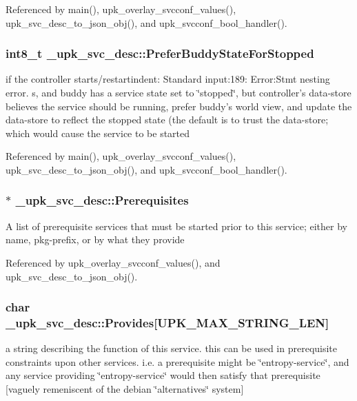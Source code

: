 Referenced by main(), upk\_\-overlay\_\-svcconf\_\-values(), upk\_\-svc\_\-desc\_\-to\_\-json\_\-obj(), and upk\_\-svcconf\_\-bool\_\-handler().

\subsubsection[{PreferBuddyStateForStopped}]{\setlength{\rightskip}{0pt plus 5cm}int8\_\-t {\bf \_\-upk\_\-svc\_\-desc::PreferBuddyStateForStopped}}\label{struct__upk__svc__desc_a7122c24ad2843e92e8375826884c117e}
if the controller starts/restartindent: Standard input:189: Error:Stmt nesting error. s, and buddy has a service state set to \char`\"{}stopped\char`\"{}, but controller's data-\/store believes the service should be running, prefer buddy's world view, and update the data-\/store to reflect the stopped state (the default is to trust the data-\/store; which would cause the service to be started 

Referenced by main(), upk\_\-overlay\_\-svcconf\_\-values(), upk\_\-svc\_\-desc\_\-to\_\-json\_\-obj(), and upk\_\-svcconf\_\-bool\_\-handler().

\subsubsection[{Prerequisites}]{$\ast$ {\bf \_\-upk\_\-svc\_\-desc::Prerequisites}}\label{struct__upk__svc__desc_ad95e655e903c314415642d05ebfdba5b}
A list of prerequisite services that must be started prior to this service; either by name, pkg-\/prefix, or by what they provide 

Referenced by upk\_\-overlay\_\-svcconf\_\-values(), and upk\_\-svc\_\-desc\_\-to\_\-json\_\-obj().

\subsubsection[{Provides}]{\setlength{\rightskip}{0pt plus 5cm}char {\bf \_\-upk\_\-svc\_\-desc::Provides}[UPK\_\-MAX\_\-STRING\_\-LEN]}\label{struct__upk__svc__desc_a3dde85561c4db5277109a1c4336737e9}
a string describing the function of this service. this can be used in prerequisite constraints upon other services. i.e. a prerequisite might be \char`\"{}entropy-\/service\char`\"{}, and any service providing \char`\"{}entropy-\/service\char`\"{} would then satisfy that prerequisite [vaguely remeniscent of the debian \char`\"{}alternatives\char`\"{} system] 

